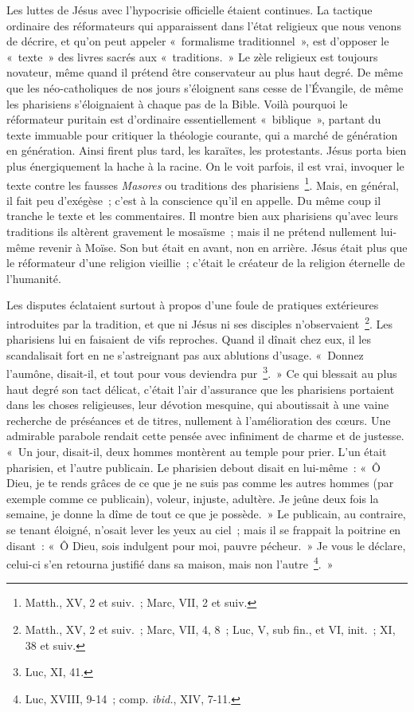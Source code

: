 \documentclass[french,twoside]{book} %
\begin{document}
Les luttes de Jésus avec l’hypocrisie officielle étaient continues. La tactique ordinaire des réformateurs qui apparaissent dans l’état religieux que nous venons de décrire, et qu’on peut appeler « formalisme traditionnel », est d’opposer le « texte » des livres sacrés aux « traditions. » Le zèle religieux est toujours novateur, même quand il prétend être conservateur au plus haut degré. De même que les néo-catholiques de nos jours s’éloignent sans cesse de l’Évangile, de même les pharisiens s’éloignaient à chaque pas de la Bible. Voilà pourquoi le réformateur puritain est d’ordinaire essentiellement « biblique », partant du texte immuable pour critiquer la théologie courante, qui a marché de génération en génération. Ainsi firent plus tard, les karaïtes, les protestants. Jésus porta bien plus énergiquement la hache à la racine. On le voit parfois, il est vrai, invoquer le texte contre les fausses {\itshape Masores} ou traditions des pharisiens \footnote{Matth., XV, 2 et suiv. ; Marc, VII, 2 et suiv.}. Mais, en général, il fait peu d’exégèse ; c’est à la conscience qu’il en appelle. Du même coup il tranche le texte et les commentaires. Il montre bien aux pharisiens qu’avec leurs traditions ils altèrent gravement le mosaïsme ; mais il ne prétend nullement lui-même revenir à Moïse. Son but était en avant, non en arrière. Jésus était plus que le réformateur d’une religion vieillie ; c’était le créateur de la religion éternelle de l’humanité.\par
Les disputes éclataient surtout à propos d’une foule de pratiques extérieures introduites par la tradition, et que ni Jésus ni ses disciples n’observaient \footnote{Matth., XV, 2 et suiv. ; Marc, VII, 4, 8 ; Luc, V, sub fin., et VI, init. ; XI, 38 et suiv.}. Les pharisiens lui en faisaient de vifs reproches. Quand il dînait chez eux, il les scandalisait fort en ne s’astreignant pas aux ablutions d’usage. « Donnez l’aumône, disait-il, et tout pour vous deviendra pur \footnote{Luc, XI, 41.}. » Ce qui blessait au plus haut degré son tact délicat, c’était l’air d’assurance que les pharisiens portaient dans les choses religieuses, leur dévotion mesquine, qui aboutissait à une vaine recherche de préséances et de titres, nullement à l’amélioration des cœurs. Une admirable parabole rendait cette pensée avec infiniment de charme et de justesse. « Un jour, disait-il, deux hommes montèrent au temple pour prier. L’un était pharisien, et l’autre publicain. Le pharisien debout disait en lui-même : « Ô Dieu, je te rends grâces de ce que je ne suis pas comme les autres hommes (par exemple comme ce publicain), voleur, injuste, adultère. Je jeûne deux fois la semaine, je donne la dîme de tout ce que je possède. » Le publicain, au contraire, se tenant éloigné, n’osait lever les yeux au ciel ; mais il se frappait la poitrine en disant : « Ô Dieu, sois indulgent pour moi, pauvre pécheur. » Je vous le déclare, celui-ci s’en retourna justifié dans sa maison, mais non l’autre \footnote{ Luc, XVIII, 9-14 ; comp. {\itshape ibid.}, XIV, 7-11.}. »\par
\end{document}
